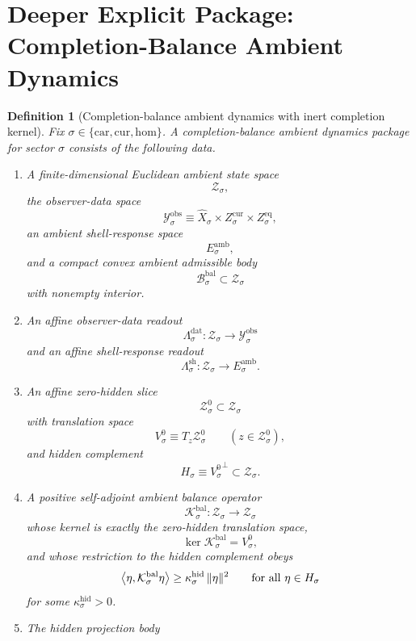 \documentclass[11pt]{article}
\newcommand{\Car}{\mathrm{car}}
\newcommand{\Cur}{\mathrm{cur}}
\newcommand{\Hom}{\mathrm{hom}}
\newcommand{\VisibleAffine}[1]{\widehat X_{#1}}
\newcommand{\DataSpace}[1]{\mathcal Y_{#1}^{\mathrm{obs}}}
\newcommand{\AmbientTarget}[1]{E_{#1}^{\mathrm{amb}}}
\newcommand{\BalSpace}[1]{\mathcal Z_{#1}}
\newcommand{\BalBody}[1]{\mathcal B_{#1}^{\mathrm{bal}}}
\newcommand{\BalData}[1]{\Lambda_{#1}^{\mathrm{dat}}}
\newcommand{\BalShell}[1]{\Lambda_{#1}^{\mathrm{sh}}}
\newcommand{\ZeroHiddenSlice}[1]{\mathcal Z_{#1}^{0}}
\newcommand{\ZeroHiddenVec}[1]{V_{#1}^{0}}
\newcommand{\BalOp}[1]{\mathcal K_{#1}^{\mathrm{bal}}}
\newcommand{\GapSpace}[1]{H_{#1}}
\newtheorem{definition}{Definition}
\begin{document}
\section{Deeper Explicit Package: Completion-Balance Ambient Dynamics}

\begin{definition}[Completion-balance ambient dynamics with inert completion kernel]
\label{def:ambient}
Fix \(\sigma\in\{\Car,\Cur,\Hom\}\). A \emph{completion-balance ambient dynamics package} for sector \(\sigma\) consists of the following data.
\begin{enumerate}
    \item A finite-dimensional Euclidean ambient state space
    \[
    \BalSpace{\sigma},
    \]
    the observer-data space
    \[
    \DataSpace{\sigma}
    \equiv
    \VisibleAffine{\sigma}\times Z_{\sigma}^{\mathrm{cur}}\times Z_{\sigma}^{\mathrm{eq}},
    \]
    an ambient shell-response space
    \[
    \AmbientTarget{\sigma},
    \]
    and a compact convex ambient admissible body
    \[
    \BalBody{\sigma}\subset\BalSpace{\sigma}
    \]
    with nonempty interior.
    \item An affine observer-data readout
    \[
    \BalData{\sigma}:\BalSpace{\sigma}\to\DataSpace{\sigma}
    \]
    and an affine shell-response readout
    \[
    \BalShell{\sigma}:\BalSpace{\sigma}\to\AmbientTarget{\sigma}.
    \]
    \item An affine zero-hidden slice
    \[
    \ZeroHiddenSlice{\sigma}\subset\BalSpace{\sigma}
    \]
    with translation space
    \[
    \ZeroHiddenVec{\sigma}\equiv T_{z}\ZeroHiddenSlice{\sigma}
    \qquad
    (z\in\ZeroHiddenSlice{\sigma}),
    \]
    and hidden complement
    \[
    \GapSpace{\sigma}
    \equiv
    {\ZeroHiddenVec{\sigma}}^{\perp}\subset\BalSpace{\sigma}.
    \]
    \item A positive self-adjoint ambient balance operator
    \[
    \BalOp{\sigma}:\BalSpace{\sigma}\to\BalSpace{\sigma}
    \]
    whose kernel is exactly the zero-hidden translation space,
    \[
    \ker \BalOp{\sigma}=\ZeroHiddenVec{\sigma},
    \]
    and whose restriction to the hidden complement obeys
    \begin{equation}
    \ev{\eta,\BalOp{\sigma}\eta}
    \ge
    \kappa_{\sigma}^{\mathrm{hid}}\,
    \|\eta\|^{2}
    \qquad
    \text{for all }\eta\in\GapSpace{\sigma}
    \label{eq:ambientgap}
    \end{equation}
    for some \(\kappa_{\sigma}^{\mathrm{hid}}>0\).
    \item The hidden projection body

\end{enumerate}
\end{definition}
\end{document}
